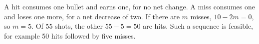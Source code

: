 A hit consumes one bullet and earns one, for no net change. A miss consumes one and loses one more, for a net decrease of two. If there are $m$ misses, $10-2m=0$, so $m=5$. Of 55 shots, the other $55-5=\boxed{50}$ are hits. Such a sequence is feasible, for example 50 hits followed by five misses.
